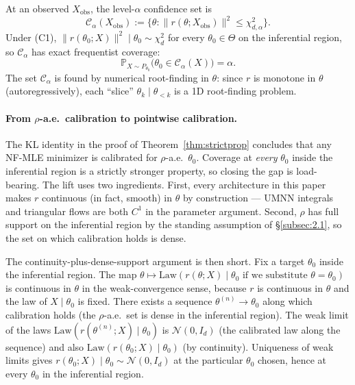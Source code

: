 \documentclass[11pt]{article}
\begin{document}
At an observed \(X_\mathrm{obs}\), the level-\(\alpha\) confidence set
is \[
\mathcal{C}_\alpha(X_\mathrm{obs}) := \bigl\{\theta : \|r(\theta; X_\mathrm{obs})\|^2 \leq \chi^2_{d, \alpha}\bigr\}.
\] Under (C1), \(\|r(\theta_0; X)\|^2 \mid \theta_0 \sim \chi^2_d\) for
every \(\theta_0 \in \Theta\) on the inferential region, so
\(\mathcal{C}_\alpha\) has exact frequentist coverage: \[
\mathbb{P}_{X \sim P_{\theta_0}}\bigl(\theta_0 \in \mathcal{C}_\alpha(X)\bigr) = \alpha.
\] The set \(\mathcal{C}_\alpha\) is found by numerical root-finding in
\(\theta\): since \(r\) is monotone in \(\theta\) (autoregressively),
each ``slice'' \(\theta_k \mid \theta_{<k}\) is a 1D root-finding
problem.

\paragraph{From \(\rho\)-a.e.\ calibration to pointwise calibration.}
The KL identity in the proof of Theorem~\ref{thm:strictprop} concludes
that any NF-MLE minimizer is calibrated for \(\rho\)-a.e.\ \(\theta_0\).
Coverage at \emph{every} \(\theta_0\) inside the inferential region is
a strictly stronger property, so closing the gap is load-bearing. The
lift uses two ingredients. First, every architecture in this paper
makes \(r\) continuous (in fact, smooth) in \(\theta\) by construction
--- UMNN integrals and triangular flows are both \(C^1\) in the
parameter argument. Second, \(\rho\) has full support on the
inferential region by the standing assumption of \S\ref{subsec:2.1}, so
the set on which calibration holds is dense.

The continuity-plus-dense-support argument is then short. Fix a target
\(\theta_0\) inside the inferential region. The map
\(\theta \mapsto \mathrm{Law}(r(\theta; X) \mid \theta_0 \text{ if we substitute } \theta = \theta_0)\)
is continuous in \(\theta\) in the weak-convergence sense, because
\(r\) is continuous in \(\theta\) and the law of \(X \mid \theta_0\) is
fixed. There exists a sequence
\(\theta^{(n)} \to \theta_0\) along which calibration holds (the
\(\rho\)-a.e.\ set is dense in the inferential region). The weak limit
of the laws \(\mathrm{Law}(r(\theta^{(n)}; X) \mid \theta_0)\) is
\(\mathcal{N}(0, I_d)\) (the calibrated law along the sequence) and
also \(\mathrm{Law}(r(\theta_0; X) \mid \theta_0)\) (by continuity).
Uniqueness of weak limits gives
\(r(\theta_0; X) \mid \theta_0 \sim \mathcal{N}(0, I_d)\) at the
particular \(\theta_0\) chosen, hence at every \(\theta_0\) in the
inferential region.
\end{document}

